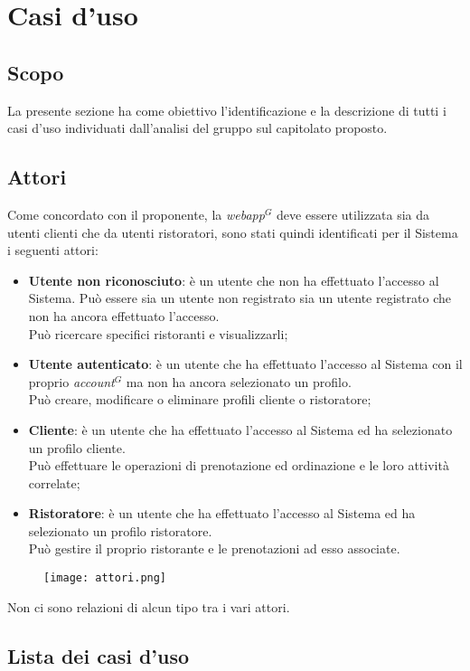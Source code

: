 \nonstopmode
\section{Casi d'uso}
\subsection{Scopo}

La presente sezione ha come obiettivo l'identificazione e la descrizione di tutti i casi d'uso individuati dall'analisi del gruppo sul capitolato proposto.

\subsection{Attori}
Come concordato con il proponente, la \emph{webapp}$^{G}$ deve essere utilizzata sia da utenti clienti che da utenti ristoratori, sono stati quindi identificati per il Sistema i seguenti attori:

\begin{itemize}
\item \textbf{Utente non riconosciuto}: è un utente che non ha effettuato l'accesso al Sistema. Può essere sia un utente non registrato sia un utente registrato che non ha ancora effettuato l'accesso.\\ Può ricercare specifici ristoranti e visualizzarli;
\item \textbf{Utente autenticato}: è un utente che ha effettuato l'accesso al Sistema con il proprio \emph{account}$^{G}$ ma non ha ancora selezionato un profilo.\\ Può creare, modificare o eliminare profili cliente o ristoratore;
\item \textbf{Cliente}: è un utente che ha effettuato l'accesso al Sistema ed ha selezionato un profilo cliente.\\ Può effettuare le operazioni di prenotazione ed ordinazione e le loro attività correlate;
\item \textbf{Ristoratore}: è un utente che ha effettuato l'accesso al Sistema ed ha selezionato un profilo ristoratore.\\ Può gestire il proprio ristorante e le prenotazioni ad esso associate.
\end{itemize}
\begin{figure}[h] \texttt{[image: attori.png]} \end{figure}

Non ci sono relazioni di alcun tipo tra i vari attori.

\pagebreak
\subsection{Lista dei casi d'uso}









